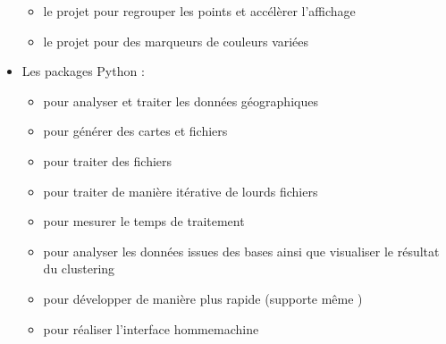 \documentclass[letterpaper,10pt,french]{sphinxmanual}
\begin{document}
\begin{itemize}
\begin{itemize}
\item {} 
\sphinxAtStartPar
le projet
pour regrouper les points et accélèrer l’affichage

\item {} 
\sphinxAtStartPar
le projet
pour des marqueurs de couleurs variées

\end{itemize}

\item {} 
\sphinxAtStartPar
Les packages Python :
\begin{itemize}
\item {} 
\sphinxAtStartPar
{} pour analyser et
traiter les données géographiques

\item {} 
\sphinxAtStartPar
{}
pour générer des cartes et fichiers 

\item {} 
\sphinxAtStartPar
{} pour
traiter des fichiers 

\item {} 
\sphinxAtStartPar
{} pour traiter de
manière itérative de lourds fichiers 

\item {} 
\sphinxAtStartPar
{} pour
mesurer le temps de traitement

\item {} 
\sphinxAtStartPar
{} pour analyser les
données issues des bases ainsi que visualiser le résultat du
clustering

\item {} 
\sphinxAtStartPar
{} pour développer de manière
plus rapide (supporte même )

\item {} 
\sphinxAtStartPar
{}
pour réaliser l’interface homme\sphinxhyphen{}machine


\end{itemize}
\end{itemize}
\end{document}
